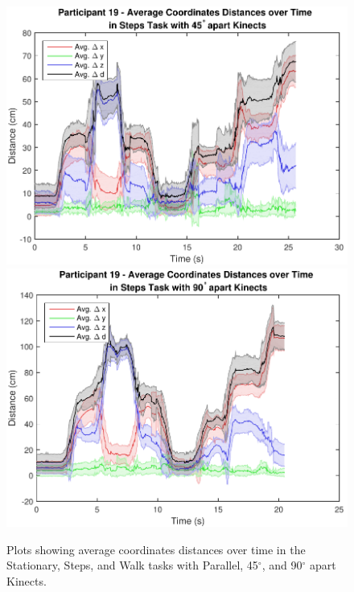 \begin{figure}[!h]
{    \includegraphics[width=0.33\linewidth]{figs/Participant_19_Task_Steps_Kinect_45_coordinates_over_time}
    \includegraphics[width=0.33\linewidth]{figs/Participant_19_Task_Steps_Kinect_90_coordinates_over_time}
    \label{fig:steps_coordinates_over_time}
  } \\

  \caption{Plots showing average coordinates distances over time in the Stationary, Steps, and Walk tasks with Parallel, 45$^{\circ}$, and 90$^{\circ}$ apart Kinects.}

  \label{fig:results_three_coordinates_over_time}
\end{figure}

